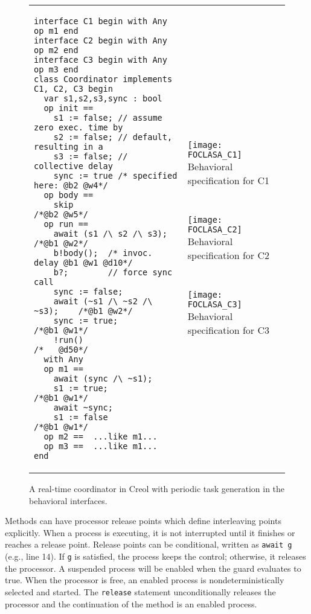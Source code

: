 \documentclass[copyright,creativecommons]{eptcs}
\theoremstyle{definition}
\begin{document}
\begin{figure}[t]

\begin{tabular}{m{}m{}}

\begin{lstlisting}
interface C1 begin with Any op m1 end
interface C2 begin with Any op m2 end
interface C3 begin with Any op m3 end
class Coordinator implements C1, C2, C3 begin
  var s1,s2,s3,sync : bool
  op init ==
    s1 := false; // assume zero exec. time by
    s2 := false; // default, resulting in a
    s3 := false; // collective delay
    sync := true /* specified here: @b2 @w4*/
  op body ==
    skip                          /*@b2 @w5*/
  op run ==
    await (s1 /\ s2 /\ s3);       /*@b1 @w2*/
    b!body();  /* invoc. delay @b1 @w1 @d10*/
    b?;        // force sync call
    sync := false;
    await (~s1 /\ ~s2 /\ ~s3);    /*@b1 @w2*/
    sync := true;                 /*@b1 @w1*/
    !run()                        /*   @d50*/
  with Any
  op m1 ==
    await (sync /\ ~s1);
    s1 := true;                   /*@b1 @w1*/
    await ~sync;
    s1 := false                   /*@b1 @w1*/
  op m2 ==  ...like m1...
  op m3 ==  ...like m1...
end
\end{lstlisting}


&

{\small
\centering
\texttt{[image: FOCLASA\_C1]} \\ Behavioral specification for C1 \\ ~ \\~ \\
\texttt{[image: FOCLASA\_C2]} \\ Behavioral specification for C2 \\ ~ \\~ \\
\texttt{[image: FOCLASA\_C3]} \\ Behavioral specification for C3
}

\end{tabular}
\vspace{-0.5cm}
\caption{A real-time coordinator in Creol with periodic task generation in the behavioral interfaces.}
\label{fig::creolCode}\label{fig::periodicBeh}

\end{figure}


\lstset{language=Uppaal, basicstyle=\footnotesize}


Methods can have processor release points which define interleaving points explicitly.
When a process is executing, it is not interrupted until it finishes or reaches a release point.
Release points can be conditional, written as \lstinline $await g$ (e.g., line 14).
If \lstinline $g$ is satisfied, the process keeps the control; otherwise, it releases  the processor.
A suspended process will be enabled when the guard evaluates to true.
When the processor is free, an enabled process is nondeterministically selected and started.
The \lstinline $release$ statement unconditionally releases the processor and the continuation of the  method is an enabled process.
\end{document}
